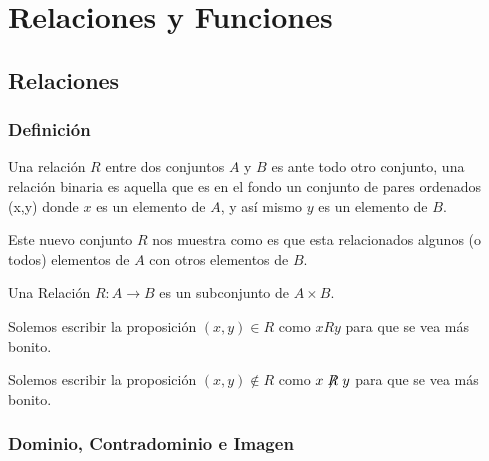 \documentclass[12pt, fleqn]{report}                             %
\begin{document}
\part{Relaciones y Funciones}



    \chapter{Relaciones}
        \clearpage

        \section{Definición}

            Una relación $R$ entre dos conjuntos $A$ y $B$ es ante todo otro conjunto, una relación
            binaria es aquella que es en el fondo un conjunto de pares ordenados (x,y) donde $x$ es un
            elemento de $A$, y así mismo $y$ es un elemento de $B$.

            Este nuevo conjunto $R$ nos muestra como es que esta relacionados algunos (o todos) elementos de
            $A$ con otros elementos de $B$.


            Una Relación $R: A \to B$ es un subconjunto de $A \times B$.

            Solemos escribir la proposición $(x, y) \in R$ como $x R y$ para que se vea más bonito.

            Solemos escribir la proposición $(x, y) \notin R$ como $x\centernot{R}y$ para que se vea más bonito.



        \clearpage
        \section{Dominio, Contradominio e Imagen}
                
\end{document}
